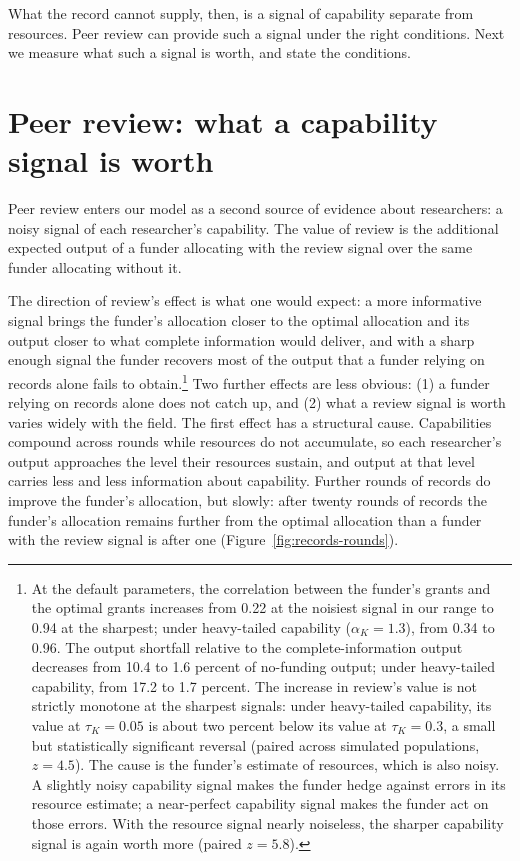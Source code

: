 \documentclass[article, 11pt, reqno]{amsart}
\theoremstyle{named}
\begin{document}


What the record cannot supply, then, is a signal of capability separate from resources. Peer review can provide such a signal under the right conditions. Next we measure what such a signal is worth, and state the conditions.

\section{Peer review: what a capability signal is worth}\label{sec:review}

Peer review enters our model as a second source of evidence about researchers: a noisy signal of each researcher's capability. The value of review is the additional expected output of a funder allocating with the review signal over the same funder allocating without it.

The direction of review's effect is what one would expect: a more informative signal brings the funder's allocation closer to the optimal allocation and its output closer to what complete information would deliver, and with a sharp enough signal the funder recovers most of the output that a funder relying on records alone fails to obtain.\footnote{At the default parameters, the correlation between the funder's grants and the optimal grants increases from 0.22 at the noisiest signal in our range to 0.94 at the sharpest; under heavy-tailed capability ($\alpha_K = 1.3$), from 0.34 to 0.96. The output shortfall relative to the complete-information output decreases from 10.4 to 1.6 percent of no-funding output; under heavy-tailed capability, from 17.2 to 1.7 percent. The increase in review's value is not strictly monotone at the sharpest signals: under heavy-tailed capability, its value at $\tau_K = 0.05$ is about two percent below its value at $\tau_K = 0.3$, a small but statistically significant reversal (paired across simulated populations, $z = 4.5$). The cause is the funder's estimate of resources, which is also noisy. A slightly noisy capability signal makes the funder hedge against errors in its resource estimate; a near-perfect capability signal makes the funder act on those errors. With the resource signal nearly noiseless, the sharper capability signal is again worth more (paired $z = 5.8$).} Two further effects are less obvious: (1) a funder relying on records alone does not catch up, and (2) what a review signal is worth varies widely with the field. The first effect has a structural cause. Capabilities compound across rounds while resources do not accumulate, so each researcher's output approaches the level their resources sustain, and output at that level carries less and less information about capability. Further rounds of records do improve the funder's allocation, but slowly: after twenty rounds of records the funder's allocation remains further from the optimal allocation than a funder with the review signal is after one (Figure~\ref{fig:records-rounds}).
\end{document}
